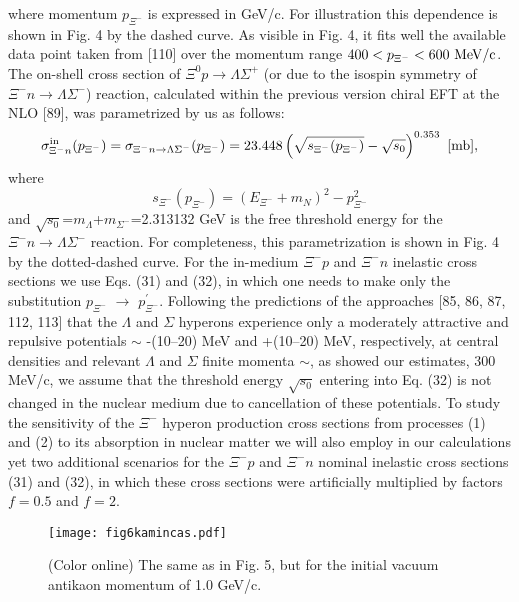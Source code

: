 \documentclass[12pt]{article}
\begin{document}
where momentum $p_{\Xi^-}$ is expressed in GeV/c. For illustration this dependence
is shown in Fig. 4 by the dashed curve. As visible in Fig. 4, it fits well the available data point
taken from [110] over the momentum range $400 < p_{\Xi^-} < 600~{\rm MeV/c}$. The on-shell cross section
of $\Xi^0p \to {\Lambda}\Sigma^+$ (or due to the isospin symmetry of $\Xi^-n \to {\Lambda}\Sigma^-$)
reaction, calculated within the previous version chiral EFT at the NLO [89], was parametrized by us
as follows:
\begin{equation}
\sigma_{{\Xi^-}n}^{\rm in}(p_{\Xi^-})=\sigma_{\Xi^-n \to {\Lambda}\Sigma^-}(p_{\Xi^-})=
23.448\left(\sqrt{s_{\Xi^-}(p_{\Xi^-})}-\sqrt{s_0}\right)^{0.353}~[{\rm mb}],
\end{equation}
where
\begin{equation}
s_{\Xi^-}(p_{\Xi^-})=(E_{\Xi^-}+m_N)^2-p_{\Xi^-}^2
\end{equation}
and $\sqrt{s_0}$=$m_{\Lambda}$+$m_{\Sigma^-}$=2.313132 GeV is the free threshold energy for the
$\Xi^-n \to {\Lambda}\Sigma^-$ reaction. For completeness, this parametrization is shown in Fig. 4
by the dotted-dashed curve. For the in-medium ${\Xi^-}p$ and ${\Xi^-}n$ inelastic cross sections
we use Eqs. (31) and (32), in which one needs to make only the substitution
$p_{\Xi^-}$ $\to$ $p^{\prime}_{\Xi^-}$.
Following the predictions of the approaches [85, 86, 87, 112, 113] that the $\Lambda$ and $\Sigma$
hyperons experience only a moderately attractive and repulsive potentials $\sim$
-(10--20) MeV and +(10--20) MeV, respectively, at central densities and relevant $\Lambda$ and
$\Sigma$ finite momenta $\sim$, as showed our estimates, 300 MeV/c, we assume that the threshold energy
$\sqrt{s_0}$ entering into Eq. (32) is not changed in the nuclear medium due to cancellation of these
potentials. To study the sensitivity of the $\Xi^-$ hyperon production cross sections from processes (1)
and (2) to its absorption in nuclear matter we will also employ in our calculations yet two additional
scenarios for the $\Xi^-p$ and $\Xi^-n$ nominal inelastic cross sections (31) and (32), in which these
cross sections were artificially multiplied by factors $f=0.5$ and $f=2$.
\begin{figure}[!h]
\begin{center}
\texttt{[image: fig6kamincas.pdf]}
\vspace*{-2mm} \caption{(Color online) The same as in Fig. 5,
but for the initial vacuum antikaon momentum of 1.0 GeV/c.}
\label{void}
\end{center}
\end{figure}
\end{document}
